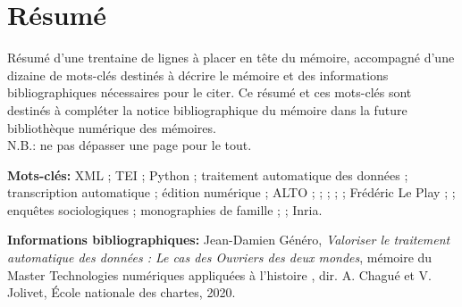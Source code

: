 \section*{Résumé}

\bigbreak

 Résumé d'une trentaine de lignes à placer en tête du mémoire, accompagné d'une dizaine de mots-clés destinés à décrire le mémoire et des informations bibliographiques nécessaires pour le citer. Ce résumé et ces mots-clés sont destinés à compléter la notice bibliographique du mémoire dans la future bibliothèque numérique des mémoires.\\
N.B.: ne pas dépasser une page pour le tout.

\bigbreak

\textbf{Mots-clés:} XML ; TEI ; Python ; traitement automatique des données ; transcription automatique ; édition numérique ; ALTO ; \ocr ; \kraken{} ; \transkribus{} ; \gitlab{} ; Frédéric Le Play ; \lodm{} ; enquêtes sociologiques ; monographies de famille ; \timeus{} ; Inria.

\bigbreak

\textbf{Informations bibliographiques:} Jean-Damien Généro, \textit{Valoriser le traitement automatique des données : Le cas des Ouvriers des deux mondes}, mémoire du Master \og Technologies numériques appliquées à l'histoire \fg{}, dir. A. Chagué et V. Jolivet, École nationale des chartes, 2020.